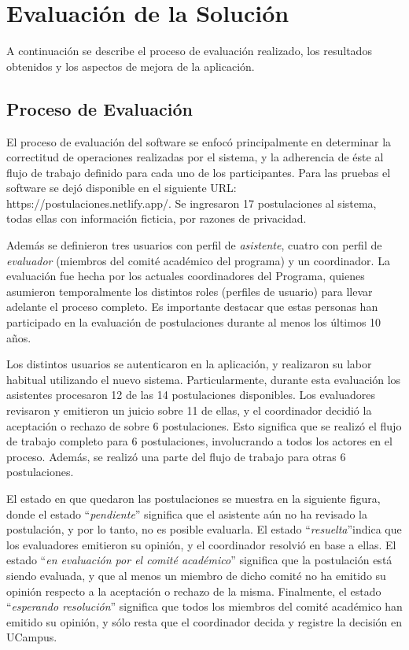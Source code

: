 \chapter{Evaluación de la Solución}

A continuación se describe el proceso de evaluación realizado, los resultados
obtenidos y los aspectos de mejora de la aplicación.

\section{Proceso de Evaluación}

El proceso de evaluación del software se enfocó principalmente en determinar la
correctitud de operaciones realizadas por el sistema, y la adherencia de éste al
flujo de trabajo definido para cada uno de los participantes. Para las pruebas
el software se dejó disponible en el siguiente URL:
https://postulaciones.netlify.app/. Se ingresaron 17 postulaciones al sistema,
todas ellas con información ficticia, por razones de privacidad.

Además se definieron tres usuarios con perfil de \emph{asistente}, cuatro con perfil de
\emph{evaluador} (miembros del comité académico del programa) y un coordinador. La
evaluación fue hecha por los actuales coordinadores del Programa, quienes
asumieron temporalmente los distintos roles (perfiles de usuario) para llevar
adelante el proceso completo. Es importante destacar que estas personas han
participado en la evaluación de postulaciones durante al menos los últimos 10
años. 

Los distintos usuarios se autenticaron en la aplicación, y realizaron su labor
habitual utilizando el nuevo sistema. Particularmente, durante esta evaluación
los asistentes procesaron 12 de las 14 postulaciones disponibles. Los
evaluadores revisaron y emitieron un juicio sobre 11 de ellas, y el coordinador
decidió la aceptación o rechazo de sobre 6 postulaciones. Esto significa que se
realizó el flujo de trabajo completo para 6 postulaciones, involucrando a todos
los actores en el proceso. Además, se realizó una parte del flujo de trabajo
para otras 6 postulaciones.

El estado en que quedaron las postulaciones se muestra en la siguiente figura,
donde el estado “\emph{pendiente}” significa que el asistente aún no ha revisado
la postulación, y por lo tanto, no es posible evaluarla. El estado
“\emph{resuelta}”indica que los evaluadores emitieron su opinión, y el
coordinador resolvió en base a ellas. El estado “\emph{en evaluación por el
comité académico}” significa que la postulación está siendo evaluada, y que al
menos un miembro de dicho comité no ha emitido su opinión respecto a la
aceptación o rechazo de la misma. Finalmente, el estado “\emph{esperando
resolución}” significa que todos los miembros del comité académico han emitido
su opinión, y sólo resta que el coordinador decida y registre la decisión en
UCampus.

